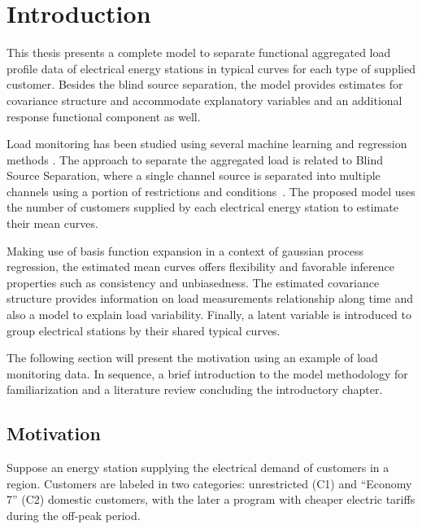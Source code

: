 



\chapter{Introduction}
\label{chap:intro}


This thesis presents a complete model to separate functional aggregated load profile data of electrical energy stations in typical curves for each type of supplied customer. Besides the blind source separation, the model provides estimates for covariance structure and accommodate explanatory variables and an additional response functional component as well.

Load monitoring has been studied using several machine learning and regression methods \cite{schirmer2019evaluation}. The approach to separate the aggregated load is related to Blind Source Separation, where a single channel source is separated into multiple channels using a portion of restrictions and conditions~\cite{cardoso1998blind}. The proposed model uses the number of customers supplied by each electrical energy station to estimate their mean curves.

Making use of basis function expansion in a context of gaussian process regression, the estimated mean curves offers flexibility and favorable inference properties such as consistency and unbiasedness. The estimated covariance structure provides information on load measurements relationship along time and also a model to explain load variability. Finally, a latent variable is introduced to group electrical stations by their shared typical curves.

% 
The following section will present the motivation using an example of load monitoring data. In sequence, a brief introduction to the model methodology for familiarization and a literature review concluding the introductory chapter.

\section{Motivation}
\label{sec:motivation}




Suppose an energy station supplying the electrical demand of customers in a region. Customers are labeled in two categories: unrestricted (C1) and ``Economy 7'' (C2) domestic customers, with the later a program with cheaper electric tariffs during the off-peak period.%

